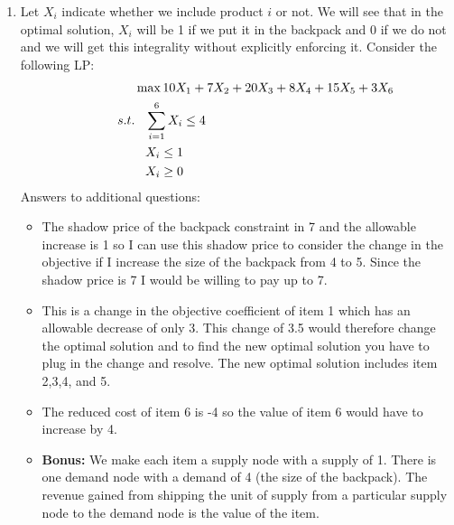 \documentclass{article}[11 pt]    %
\begin{document}
\begin{enumerate}
\item Let $X_i$ indicate whether we include product $i$ or not.  We will see that in the optimal solution, $X_i$ will be 1 if we put it in the backpack and 0 if we do not and we will get this integrality without explicitly enforcing it.  Consider the following LP:
\begin{align*}
\hspace{1.5cm}& \max 10X_{1}+7X_{2}+20X_{3} + 8X_{4} + 15X_{5} + 3X_{6} \\
s.t. &\;\;\; \sum_{i=1}^6 X_{i} \leq 4\\
&\;\;\; X_{i} \leq 1 \\
&\;\;\; X_{i} \geq 0
\end{align*}
\noindent Answers to additional questions:
\begin{itemize}
\item The shadow price of the backpack constraint in 7 and the allowable increase is 1 so I can use this shadow price to consider the change in the objective if I increase the size of the backpack from 4 to 5.  Since the shadow price is 7 I would be willing to pay up to 7.
\item  This is a change in the objective coefficient of item 1 which has an allowable decrease of only 3.  This change of 3.5 would therefore change the optimal solution and to find the new optimal solution you have to plug in the change and resolve.  The new optimal solution includes item 2,3,4, and 5.
\item The reduced cost of item 6 is -4 so the value of item 6 would have to increase by 4.
\item \textbf{Bonus:}  We make each item a supply node with a supply of 1.  There is one demand node with a demand of 4 (the size of the backpack).   The revenue gained from shipping the unit of supply from a particular supply node to the demand node is the value of the item. 
\end{itemize}
\end{enumerate}
\end{document}
